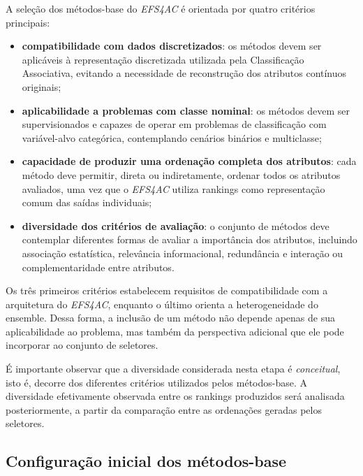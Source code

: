 A seleção dos métodos-base do \textit{EFS4AC} é orientada por quatro critérios
principais:

\begin{itemize}

    \item \textbf{compatibilidade com dados discretizados}: os métodos devem
    ser aplicáveis à representação discretizada utilizada pela Classificação
    Associativa, evitando a necessidade de reconstrução dos atributos contínuos
    originais;

    \item \textbf{aplicabilidade a problemas com classe nominal}: os métodos
    devem ser supervisionados e capazes de operar em problemas de classificação
    com variável-alvo categórica, contemplando cenários binários e multiclasse;

    \item \textbf{capacidade de produzir uma ordenação completa dos atributos}:
    cada método deve permitir, direta ou indiretamente, ordenar todos os
    atributos avaliados, uma vez que o \textit{EFS4AC} utiliza rankings como
    representação comum das saídas individuais;

    \item \textbf{diversidade dos critérios de avaliação}: o conjunto de
    métodos deve contemplar diferentes formas de avaliar a importância dos
    atributos, incluindo associação estatística, relevância informacional,
    redundância e interação ou complementaridade entre atributos.

\end{itemize}

Os três primeiros critérios estabelecem requisitos de compatibilidade com a
arquitetura do \textit{EFS4AC}, enquanto o último orienta a heterogeneidade do
ensemble. Dessa forma, a inclusão de um método não depende apenas de sua
aplicabilidade ao problema, mas também da perspectiva adicional que ele pode
incorporar ao conjunto de seletores.

É importante observar que a diversidade considerada nesta etapa é
\textit{conceitual}, isto é, decorre dos diferentes critérios utilizados pelos
métodos-base. A diversidade efetivamente observada entre os rankings produzidos
será analisada posteriormente, a partir da comparação entre as ordenações
geradas pelos seletores.


\subsection{Configuração inicial dos métodos-base}
\label{subsec:ac-efs-config-inicial}

